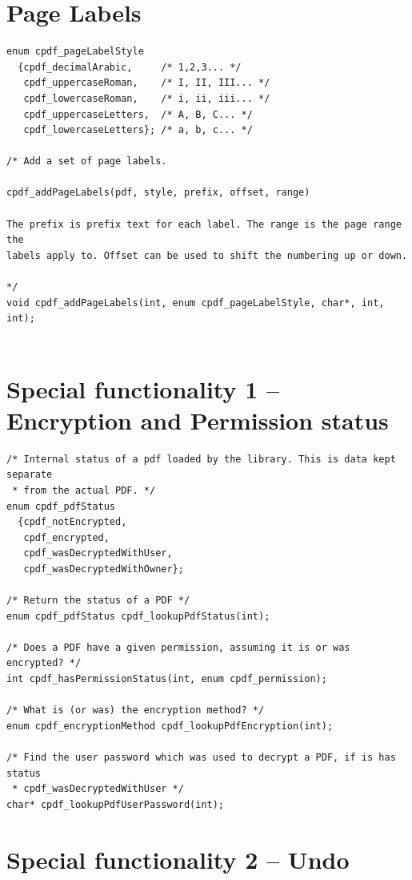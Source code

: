 \documentclass[a4paper]{memoir}
\begin{document}
\chapter{Page Labels}
\begin{small}
\begin{lstlisting}
enum cpdf_pageLabelStyle
  {cpdf_decimalArabic,     /* 1,2,3... */
   cpdf_uppercaseRoman,    /* I, II, III... */
   cpdf_lowercaseRoman,    /* i, ii, iii... */
   cpdf_uppercaseLetters,  /* A, B, C... */
   cpdf_lowercaseLetters}; /* a, b, c... */

/* Add a set of page labels.

cpdf_addPageLabels(pdf, style, prefix, offset, range)

The prefix is prefix text for each label. The range is the page range the
labels apply to. Offset can be used to shift the numbering up or down.

*/
void cpdf_addPageLabels(int, enum cpdf_pageLabelStyle, char*, int, int);


\end{lstlisting}
\end{small}

\chapter{Special functionality 1 -- Encryption and Permission status}
\begin{small}
\begin{lstlisting}
/* Internal status of a pdf loaded by the library. This is data kept separate
 * from the actual PDF. */
enum cpdf_pdfStatus
  {cpdf_notEncrypted,
   cpdf_encrypted,
   cpdf_wasDecryptedWithUser,
   cpdf_wasDecryptedWithOwner};

/* Return the status of a PDF */
enum cpdf_pdfStatus cpdf_lookupPdfStatus(int);

/* Does a PDF have a given permission, assuming it is or was encrypted? */
int cpdf_hasPermissionStatus(int, enum cpdf_permission);

/* What is (or was) the encryption method? */
enum cpdf_encryptionMethod cpdf_lookupPdfEncryption(int);

/* Find the user password which was used to decrypt a PDF, if is has status
 * cpdf_wasDecryptedWithUser */
char* cpdf_lookupPdfUserPassword(int);
\end{lstlisting}
\end{small}

\chapter{Special functionality 2 -- Undo}
\end{document}
